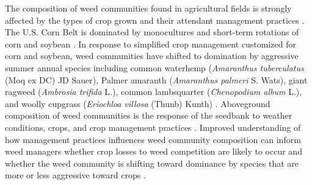 \documentclass[
]{article}
\begin{document}
The composition of weed communities found in agricultural fields is strongly affected by the types of crop grown and their attendant management practices \citep{mohlerWeedEvolutionCommunity2001}. The U.S. Corn Belt is dominated by monocultures and short-term rotations of corn and soybean \citep{centerforspatialinformationscienceandsystemsCropScapeCroplandData2021}. In response to simplified crop management customized for corn and soybean, weed communities have shifted to domination by aggressive summer annual species including common waterhemp (\emph{Amaranthus tuberculatus} (Moq ex DC) JD Sauer), Palmer amaranth (\emph{Amaranthus palmeri} S. Wats), giant ragweed (\emph{Ambrosia triﬁda} L.), common lambsquarter (\emph{Chenopodium album} L.), and woolly cupgrass (\emph{Eriochloa villosa} (Thunb) Kunth) \citep{owenWeedSpeciesShifts2008, krugerGrowerViewsProblematic2009, reddyGlyphosateresistantCropProduction2010}. Aboveground composition of weed communities is the response of the seedbank to weather conditions, crops, and crop management practices \citep{legereDiversityAssemblyWeed2005, culpepperGlyphosateinducedWeedShifts2006, smithAssemblyWeedCommunities2007}. Improved understanding of how management practices influences weed community composition can inform weed managers whether crop losses to weed competition are likely to occur and whether the weed community is shifting toward dominance by species that are more or less aggressive toward crops \citep{liebmanWeedManagementNeed2001}.
\end{document}
